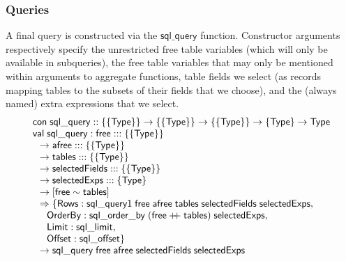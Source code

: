 \documentclass{article}
\newcommand{\mt}[1]{\mathsf{#1}}
\newcommand{\rc}{+ \hspace{-.075in} + \;}
\begin{document}
\subsubsection{Queries}

A final query is constructed via the $\mt{sql\_query}$ function.  Constructor arguments respectively specify the unrestricted free table variables (which will only be available in subqueries), the free table variables that may only be mentioned within arguments to aggregate functions, table fields we select (as records mapping tables to the subsets of their fields that we choose), and the (always named) extra expressions that we select.
$$\begin{array}{l}
  \mt{con} \; \mt{sql\_query} :: \{\{\mt{Type}\}\} \to \{\{\mt{Type}\}\} \to \{\{\mt{Type}\}\} \to \{\mt{Type}\} \to \mt{Type} \\
  \mt{val} \; \mt{sql\_query} : \mt{free} ::: \{\{\mt{Type}\}\} \\
  \hspace{.1in} \to \mt{afree} ::: \{\{\mt{Type}\}\} \\
  \hspace{.1in} \to \mt{tables} ::: \{\{\mt{Type}\}\} \\
  \hspace{.1in} \to \mt{selectedFields} ::: \{\{\mt{Type}\}\} \\
  \hspace{.1in} \to \mt{selectedExps} ::: \{\mt{Type}\} \\
  \hspace{.1in} \to [\mt{free} \sim \mt{tables}] \\
  \hspace{.1in} \Rightarrow \{\mt{Rows} : \mt{sql\_query1} \; \mt{free} \; \mt{afree} \; \mt{tables} \; \mt{selectedFields} \; \mt{selectedExps}, \\
  \hspace{.2in} \mt{OrderBy} : \mt{sql\_order\_by} \; (\mt{free} \rc \mt{tables}) \; \mt{selectedExps}, \\
  \hspace{.2in} \mt{Limit} : \mt{sql\_limit}, \\
  \hspace{.2in} \mt{Offset} : \mt{sql\_offset}\} \\
  \hspace{.1in} \to \mt{sql\_query} \; \mt{free} \; \mt{afree} \; \mt{selectedFields} \; \mt{selectedExps}
\end{array}$$
\end{document}
